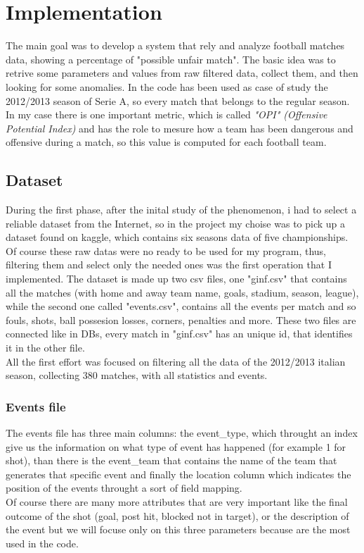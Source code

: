 \documentclass[a4paper,titlepage,11pt]{report}
\begin{document}
{\chapter{
Implementation}
The main goal was to develop a system that rely and analyze football matches data, showing a percentage of "possible unfair match". The basic idea was to retrive some parameters and values from raw filtered data, collect them, and then looking for some anomalies. In the code has been used as case of study the 2012/2013 season of Serie A, so every match that belongs to the regular season. In my case there is one important metric, which is called \textit{"OPI" (Offensive Potential Index)} and has the role to mesure how a team has been dangerous and offensive during a match, so this value is computed for each football team. 



\section{
Dataset}
During the first phase, after the inital study of the phenomenon, i had to select a reliable dataset from the Internet, so in the project my choise was to pick up a dataset found on kaggle, which contains six seasons data of five championships. Of course these raw datas were no ready to be used for my program, thus, filtering them and select only the needed ones was the first operation that I implemented. The dataset is made up two csv files, one "ginf.csv" that contains all the matches (with home and away team name, goals, stadium, season, league), while the second one called "events.csv", contains all the events per match and so fouls, shots, ball possesion losses, corners, penalties and more. These two files are connected like in DBs, every match in "ginf.csv"  has an unique id, that identifies it in the other file.\\
All the first effort was focused on filtering all the data of the 2012/2013 italian season, collecting 380 matches, with all statistics and events. 

\subsection{
Events file}
The events file has three main columns: the event\_type, which throught an index give us the information on what type of event has happened (for example 1 for shot), than there is the event\_team that contains the name of the team that generates that specific event and finally the location column which indicates the position of the events throught a sort of field mapping.\\
Of course there are many more attributes that are very important like the final outcome of the shot (goal, post hit, blocked not in target), or the description of the event but we will focuse only on this three parameters because are the most used in the code.

}
\end{document}
